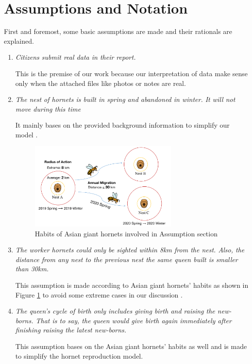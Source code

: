 \documentclass{mcmthesis}
\begin{document}
\section{Assumptions and Notation }
	First and foremost, some basic assumptions are made and their rationals are explained.
	\begin{enumerate}
		\item \textit{Citizens submit real data  in their report.}
		
		This is the premise of our work because our interpretation of data make sense only when the attached files like photos or notes are real.
	
		\item \textit{The nest of hornets is built in spring and abandoned in winter. It will not move during this time}
		
		It mainly bases on the provided background information to simplify our model \cite{intro0}.
		
		\begin{figure}[H]
	\centering
	\includegraphics[width = 0.7\textwidth]{figure/assum.png} 
	\caption{Habits of Asian giant hornets involved in Assumption section}
	\label{fig:eg1}
\end{figure}
		
		\item \textit{The worker hornets could only be sighted within 8km from the nest. Also, the distance from any nest to the previous nest the same queen built is smaller than 30km.}
		
		This assumption is made according to Asian giant hornets' habits as shown in Figure \ref{fig:eg1} to avoid some extreme cases in our discussion \cite{intro0}.	
		
		\item \textit{The queen's cycle of birth only includes giving birth and raising the new-borns. That is to say,  the queen would give birth again immediately after finishing raising the latest new-borns.}
		
		This assumption bases on the Asian giant hornets' habits as well and is made to simplify the hornet reproduction model.
	\end{enumerate}
		
\end{document}
